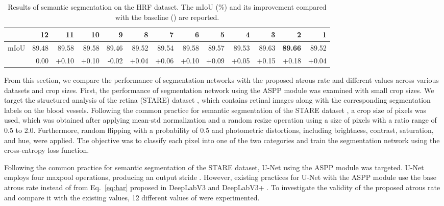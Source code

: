 \documentclass{article}
\def\eqref#1{Eq.~\ref{#1}}
\begin{document}
\begin{table}[t!]
	\caption{Results of semantic segmentation on the HRF dataset. The mIoU (\%) and its improvement  compared with the baseline () are reported.}
	\label{tab:hrf}
	\centering
    \begin{adjustbox}{width=\textwidth,center}
	\begin{tabular}{c|rrrrrrrrrrrr}
		\toprule
		      & 12    & 11    & 10    & 9     & 8     & 7     & 6     & 5     & 4     & 3     & 2          & 1     \\
		\midrule
		mIoU     & 89.48 & 89.58 & 89.58 & 89.46 & 89.52 & 89.54 & 89.58 & 89.57 & 89.53 & 89.63 & \textbf{89.66} & 89.52 \\
		 & 0.00  & +0.10 & +0.10 & -0.02 & +0.04 & +0.06 & +0.10 & +0.09 & +0.05 & +0.15 & +0.18          & +0.04 \\
		\bottomrule
	\end{tabular}
    \end{adjustbox}
\end{table}


From this section, we compare the performance of segmentation networks with the proposed atrous rate and different values across various datasets and crop sizes. First, the performance of segmentation network using the ASPP module was examined with small crop sizes. We target the structured analysis of the retina (STARE) dataset \citep{DBLP:journals/tmi/HooverKG00,DBLP:journals/tmi/HooverG03}, which contains retinal images along with the corresponding segmentation labels on the blood vessels. Following the common practice for semantic segmentation of the STARE dataset \citep{DBLP:journals/tbe/YanYC18}, a crop size of  pixels was used, which was obtained after applying mean-std normalization and a random resize operation using a size of  pixels with a ratio range of 0.5 to 2.0. Furthermore, random flipping with a probability of 0.5 and photometric distortions, including brightness, contrast, saturation, and hue, were applied. The objective was to classify each pixel into one of the two categories and train the segmentation network using the cross-entropy loss function.

Following the common practice for semantic segmentation of the STARE dataset, U-Net \citep{DBLP:conf/miccai/RonnebergerFB15} using the ASPP module was targeted. U-Net employs four  maxpool operations, producing an output stride . However, existing practices for U-Net with the ASPP module use the base atrous rate  instead of  from \eqref{eq:bar} proposed in DeepLabV3 and DeepLabV3+ \citep{mmseg2020}. To investigate the validity of the proposed atrous rate  and compare it with the existing values, 12 different values of  were experimented.
\end{document}
